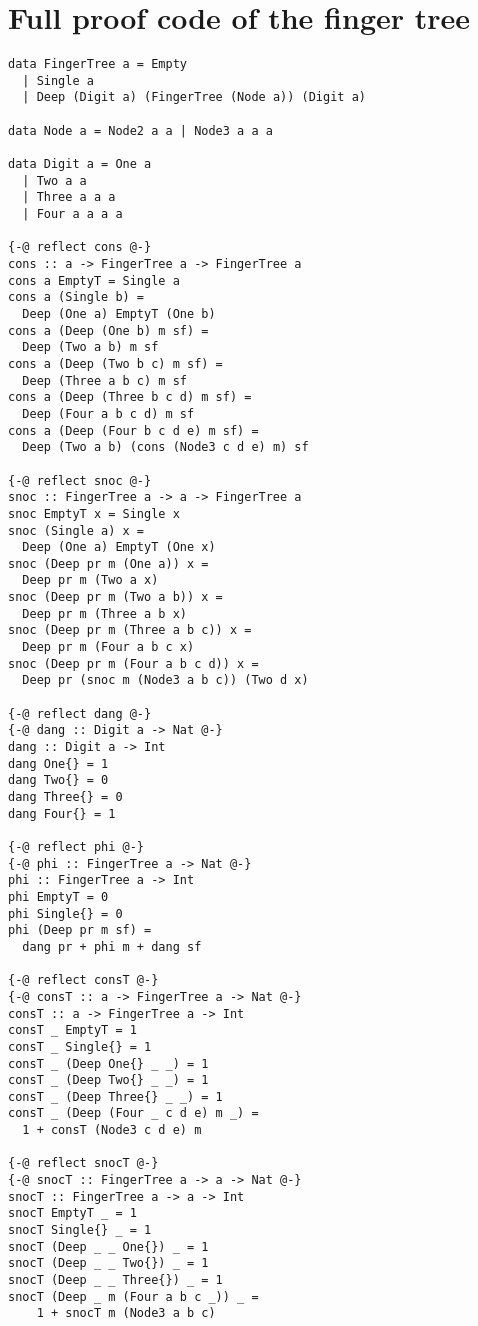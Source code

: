 \documentclass[sigplan,screen]{acmart}
\begin{document}
\section{Full proof code of the finger tree}\label{ap:fingertree}

\begin{lstlisting}
data FingerTree a = Empty
  | Single a
  | Deep (Digit a) (FingerTree (Node a)) (Digit a)

data Node a = Node2 a a | Node3 a a a

data Digit a = One a
  | Two a a
  | Three a a a
  | Four a a a a

{-@ reflect cons @-}
cons :: a -> FingerTree a -> FingerTree a
cons a EmptyT = Single a
cons a (Single b) =
  Deep (One a) EmptyT (One b)
cons a (Deep (One b) m sf) =
  Deep (Two a b) m sf
cons a (Deep (Two b c) m sf) =
  Deep (Three a b c) m sf
cons a (Deep (Three b c d) m sf) =
  Deep (Four a b c d) m sf
cons a (Deep (Four b c d e) m sf) =
  Deep (Two a b) (cons (Node3 c d e) m) sf

{-@ reflect snoc @-}
snoc :: FingerTree a -> a -> FingerTree a
snoc EmptyT x = Single x
snoc (Single a) x =
  Deep (One a) EmptyT (One x)
snoc (Deep pr m (One a)) x =
  Deep pr m (Two a x)
snoc (Deep pr m (Two a b)) x =
  Deep pr m (Three a b x)
snoc (Deep pr m (Three a b c)) x =
  Deep pr m (Four a b c x)
snoc (Deep pr m (Four a b c d)) x =
  Deep pr (snoc m (Node3 a b c)) (Two d x)

{-@ reflect dang @-}
{-@ dang :: Digit a -> Nat @-}
dang :: Digit a -> Int
dang One{} = 1
dang Two{} = 0
dang Three{} = 0
dang Four{} = 1

{-@ reflect phi @-}
{-@ phi :: FingerTree a -> Nat @-}
phi :: FingerTree a -> Int
phi EmptyT = 0
phi Single{} = 0
phi (Deep pr m sf) =
  dang pr + phi m + dang sf

{-@ reflect consT @-}
{-@ consT :: a -> FingerTree a -> Nat @-}
consT :: a -> FingerTree a -> Int
consT _ EmptyT = 1
consT _ Single{} = 1
consT _ (Deep One{} _ _) = 1
consT _ (Deep Two{} _ _) = 1
consT _ (Deep Three{} _ _) = 1
consT _ (Deep (Four _ c d e) m _) =
  1 + consT (Node3 c d e) m

{-@ reflect snocT @-}
{-@ snocT :: FingerTree a -> a -> Nat @-}
snocT :: FingerTree a -> a -> Int
snocT EmptyT _ = 1
snocT Single{} _ = 1
snocT (Deep _ _ One{}) _ = 1
snocT (Deep _ _ Two{}) _ = 1
snocT (Deep _ _ Three{}) _ = 1
snocT (Deep _ m (Four a b c _)) _ =
    1 + snocT m (Node3 a b c)


\end{lstlisting}
\end{document}
